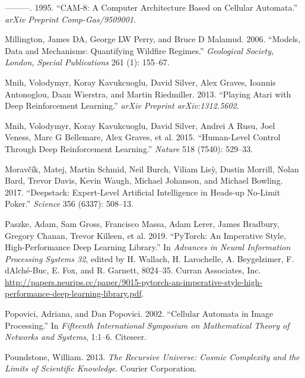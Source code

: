 \documentclass[
  12pt,
  openany]{book}
\newlength{\cslhangindent}
\newenvironment{cslreferences}%
  {\setlength{\parindent}{0pt}%
  \everypar{\setlength{\hangindent}{\cslhangindent}}\ignorespaces}%
  {\par}
\begin{document}
\begin{cslreferences}
\leavevmode\hypertarget{ref-margolus1995cam}{}%
---------. 1995. ``CAM-8: A Computer Architecture Based on Cellular Automata.'' \emph{arXiv Preprint Comp-Gas/9509001}.

\leavevmode\hypertarget{ref-millington2006models}{}%
Millington, James DA, George LW Perry, and Bruce D Malamud. 2006. ``Models, Data and Mechanisms: Quantifying Wildfire Regimes.'' \emph{Geological Society, London, Special Publications} 261 (1): 155--67.

\leavevmode\hypertarget{ref-mnih2013playing}{}%
Mnih, Volodymyr, Koray Kavukcuoglu, David Silver, Alex Graves, Ioannis Antonoglou, Daan Wierstra, and Martin Riedmiller. 2013. ``Playing Atari with Deep Reinforcement Learning.'' \emph{arXiv Preprint arXiv:1312.5602}.

\leavevmode\hypertarget{ref-mnih2015human}{}%
Mnih, Volodymyr, Koray Kavukcuoglu, David Silver, Andrei A Rusu, Joel Veness, Marc G Bellemare, Alex Graves, et al. 2015. ``Human-Level Control Through Deep Reinforcement Learning.'' \emph{Nature} 518 (7540): 529--33.

\leavevmode\hypertarget{ref-moravvcik2017deepstack}{}%
Moravčík, Matej, Martin Schmid, Neil Burch, Viliam Lisỳ, Dustin Morrill, Nolan Bard, Trevor Davis, Kevin Waugh, Michael Johanson, and Michael Bowling. 2017. ``Deepstack: Expert-Level Artificial Intelligence in Heads-up No-Limit Poker.'' \emph{Science} 356 (6337): 508--13.

\leavevmode\hypertarget{ref-NEURIPS2019_9015}{}%
Paszke, Adam, Sam Gross, Francisco Massa, Adam Lerer, James Bradbury, Gregory Chanan, Trevor Killeen, et al. 2019. ``PyTorch: An Imperative Style, High-Performance Deep Learning Library.'' In \emph{Advances in Neural Information Processing Systems 32}, edited by H. Wallach, H. Larochelle, A. Beygelzimer, F. d\textquotesingle Alché-Buc, E. Fox, and R. Garnett, 8024--35. Curran Associates, Inc. \url{http://papers.neurips.cc/paper/9015-pytorch-an-imperative-style-high-performance-deep-learning-library.pdf}.

\leavevmode\hypertarget{ref-popovici2002cellular}{}%
Popovici, Adriana, and Dan Popovici. 2002. ``Cellular Automata in Image Processing.'' In \emph{Fifteenth International Symposium on Mathematical Theory of Networks and Systems}, 1:1--6. Citeseer.

\leavevmode\hypertarget{ref-poundstone2013recursive}{}%
Poundstone, William. 2013. \emph{The Recursive Universe: Cosmic Complexity and the Limits of Scientific Knowledge}. Courier Corporation.


\end{cslreferences}
\end{document}
